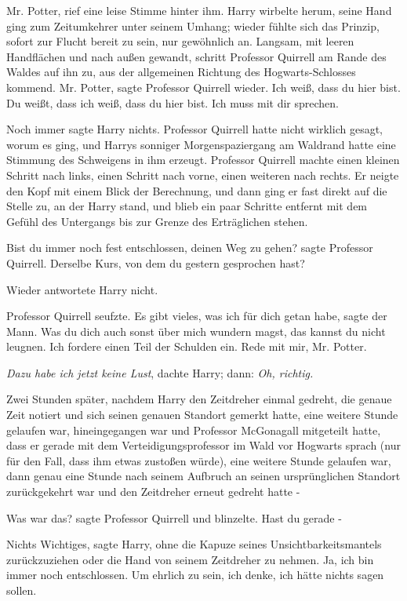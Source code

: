 \glqq Mr. Potter\grqq{}, rief eine leise Stimme hinter ihm. Harry wirbelte
herum, seine Hand ging zum Zeitumkehrer unter seinem Umhang; wieder fühlte sich
das Prinzip, sofort zur Flucht bereit zu sein, nur gewöhnlich an. Langsam, mit
leeren Handflächen und nach außen gewandt, schritt Professor Quirrell am Rande
des Waldes auf ihn zu, aus der allgemeinen Richtung des Hogwarts-Schlosses
kommend. \glqq Mr. Potter\grqq{}, sagte Professor Quirrell wieder. \glqq Ich
weiß, dass du hier bist. Du weißt, dass ich weiß, dass du hier bist. Ich muss
mit dir sprechen.\grqq{}

Noch immer sagte Harry nichts. Professor Quirrell hatte nicht wirklich gesagt,
worum es ging, und Harrys sonniger Morgenspaziergang am Waldrand hatte eine
Stimmung des Schweigens in ihm erzeugt. Professor Quirrell machte einen kleinen
Schritt nach links, einen Schritt nach vorne, einen weiteren nach rechts. Er
neigte den Kopf mit einem Blick der Berechnung, und dann ging er fast direkt auf
die Stelle zu, an der Harry stand, und blieb ein paar Schritte entfernt mit dem
Gefühl des Untergangs bis zur Grenze des Erträglichen stehen.

\glqq Bist du immer noch fest entschlossen, deinen Weg zu gehen?\grqq{} sagte
Professor Quirrell. \glqq Derselbe Kurs, von dem du gestern gesprochen
hast?\grqq{}

Wieder antwortete Harry nicht.

Professor Quirrell seufzte. \glqq Es gibt vieles, was ich für dich getan
habe\grqq{}, sagte der Mann. \glqq Was du dich auch sonst über mich wundern
magst, das kannst du nicht leugnen. Ich fordere einen Teil der Schulden ein.
Rede mit mir, Mr. Potter.\grqq{}

\emph{Dazu habe ich jetzt keine Lust}, dachte Harry; dann:\emph{ Oh, richtig.}

Zwei Stunden später, nachdem Harry den Zeitdreher einmal gedreht, die genaue
Zeit notiert und sich seinen genauen Standort gemerkt hatte, eine weitere Stunde
gelaufen war, hineingegangen war und Professor McGonagall mitgeteilt hatte, dass
er gerade mit dem Verteidigungsprofessor im Wald vor Hogwarts sprach (nur für
den Fall, dass ihm etwas zustoßen würde), eine weitere Stunde gelaufen war, dann
genau eine Stunde nach seinem Aufbruch an seinen ursprünglichen Standort
zurückgekehrt war und den Zeitdreher erneut gedreht hatte -

\glqq Was war das?\grqq{} sagte Professor Quirrell und blinzelte. \glqq Hast du
gerade -\grqq{}

\glqq Nichts Wichtiges\grqq{}, sagte Harry, ohne die Kapuze seines
Unsichtbarkeitsmantels zurückzuziehen oder die Hand von seinem Zeitdreher zu
nehmen. \glqq Ja, ich bin immer noch entschlossen. Um ehrlich zu sein, ich
denke, ich hätte nichts sagen sollen.\grqq{}

